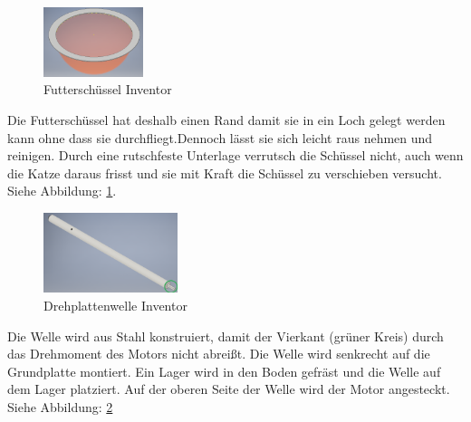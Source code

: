 \begin{figure}
\vspace{-20pt}
  \begin{center}
    \includegraphics[width=0.26\textwidth]{Bilder/Inventor/Schuessel}
  \end{center}
  \caption{Futterschüssel Inventor}
  \label{Futterschuessel_Inventor}
  \vspace{-40pt}
\end{figure}

Die Futterschüssel hat deshalb einen Rand damit sie in ein Loch gelegt werden kann ohne dass sie durchfliegt.Dennoch lässt sie sich leicht raus nehmen und reinigen. Durch eine rutschfeste Unterlage verrutsch die Schüssel nicht, auch wenn die Katze daraus frisst und sie mit Kraft die Schüssel zu verschieben versucht. \\ Siehe Abbildung: \ref{Futterschuessel_Inventor}. \\


\begin{figure}
\vspace{-20pt}
  \begin{center}
    \includegraphics[width=0.35\textwidth]{Bilder/Inventor/Drehplatte_Welle}
  \end{center}
  \caption{Drehplattenwelle Inventor}
  \label{Drehplatte_Welle_Inventor}
  \vspace{-40pt}
\end{figure}

Die Welle wird aus Stahl konstruiert, damit der Vierkant (grüner Kreis) durch das Drehmoment des Motors nicht abreißt. Die Welle wird senkrecht auf die Grundplatte montiert. Ein Lager wird in den Boden gefräst und die Welle auf dem Lager platziert. Auf der oberen Seite der Welle wird der Motor angesteckt. \\ Siehe Abbildung: \ref{Drehplatte_Welle_Inventor} 

